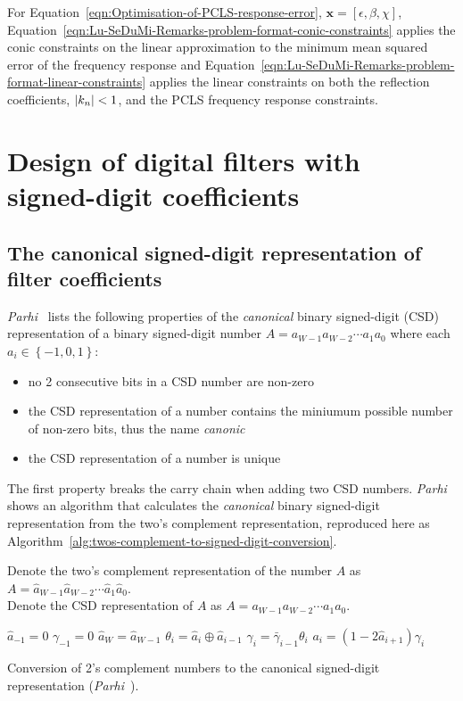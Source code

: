 \documentclass[a4paper,twoside,10pt,english]{article}
\DeclarePairedDelimiter{\mathabs}{\lvert}{\rvert}
\begin{document}
For Equation~\ref{eqn:Optimisation-of-PCLS-response-error},
$\boldsymbol{x}=\left[\epsilon,\beta,\chi\right]$,
Equation~\ref{eqn:Lu-SeDuMi-Remarks-problem-format-conic-constraints} applies
the conic constraints on the linear approximation to the minimum mean squared
error of the frequency response and 
Equation~\ref{eqn:Lu-SeDuMi-Remarks-problem-format-linear-constraints} applies
the linear constraints on both the reflection coefficients,
$\mathabs{k_{n}}<1$, and the PCLS frequency response constraints.

\section{\label{sec:Design-IIR-lattice-filters-with-signed-digit-coefficients}Design of digital filters with signed-digit coefficients}
\subsection{The canonical signed-digit representation of filter coefficients}

\emph{Parhi}~\cite[Section 13.6]{Parhi_VLSIDigitalSignalProcessingSystems} lists
the following properties of the \emph{canonical} binary signed-digit (CSD)
representation of a binary signed-digit number $A=a_{W-1}a_{W-2}\cdots{}a_{1}a_{0}$
where each $a_{i}\in \left\{-1,0,1\right\}$:
\begin{itemize}
\item no 2 consecutive bits in a CSD number are non-zero 
\item the CSD representation of a number contains the miniumum possible number
of non-zero bits, thus the name \emph{canonic}
\item the CSD representation of a number is unique
\end{itemize}
The first property breaks the carry chain when adding two CSD numbers.
\emph{Parhi}~\cite[Section 13.6.1]{Parhi_VLSIDigitalSignalProcessingSystems}
shows an algorithm that calculates the \emph{canonical} binary signed-digit 
representation from the two's complement representation, reproduced here as
Algorithm~\ref{alg:twos-complement-to-signed-digit-conversion}.

\begin{algorithm}[htbp]
Denote the two's complement representation of the number $A$ as 
$A=\hat{a}_{W-1}\hat{a}_{W-2}\cdots\hat{a}_{1}\hat{a}_{0}$. \\
Denote the CSD representation of $A$ as $A=a_{W-1}a_{W-2}\cdots{}a_{1}a_{0}$.

\begin{algorithmic}
\State $\hat{a}_{-1}=0$
\State $\gamma_{-1}=0$
\State $\hat{a}_{W}=\hat{a}_{W-1}$
\State $\theta_{i}=\hat{a}_{i}\oplus\hat{a}_{i-1}$
\State $\gamma_{i}=\bar{\gamma}_{i-1}\theta_{i}$
\State $a_{i}=\left(1-2\hat{a}_{i+1}\right)\gamma_{i}$
\EndFor
\end{algorithmic}
\caption{Conversion of 2's complement numbers to the canonical signed-digit
  representation (\emph{Parhi}~\cite[Section
  13.6.1]{Parhi_VLSIDigitalSignalProcessingSystems}).}
\label{alg:twos-complement-to-signed-digit-conversion}
\end{algorithm}
\end{document}
